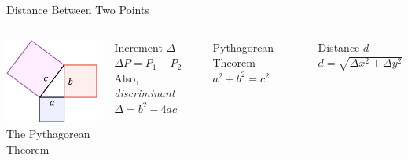 \documentclass[14pt,aspectratio=169]{beamer}
\begin{document}
\begin{frame}{Distance Between Two Points}
  \begin{columns}
   \centering
    \includegraphics[width=1\textwidth]{image05}\\The Pythagorean Theorem
    \begin{block}{Increment $\Delta$} \centering
      $\Delta P = P_1 - P_2$ \\
      Also, \textit{discriminant} $\Delta=b^2-4ac$
    \end{block}

    \begin{block}{Pythagorean Theorem} \centering
     $a^2 + b^2 = c^2$
    \end{block}

    \begin{block}{Distance $d$}\centering
    $d=\sqrt{\Delta x^2 + \Delta y^2}$
    \end{block}

  \end{columns}

\end{frame}
\end{document}
